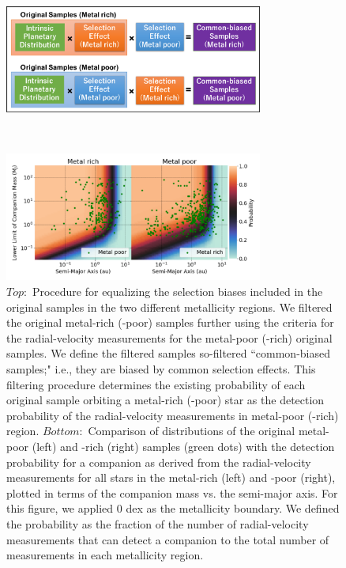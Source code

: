 \documentclass[twocolumn]{aastex62}
\begin{document}
\begin{CJK*}{UTF8}{min}
\begin{figure}
\begin{minipage}[t]{1\hsize}
\begin{center}
\includegraphics[width=8.5cm]{procedure.pdf}
\end{center}
\end{minipage} \\
\begin{minipage}[t]{1\hsize}
\begin{center}
\includegraphics[width=8.5cm]{bias_one.pdf}
\caption{$Top:$ Procedure for equalizing the selection biases included in the original samples in the two different metallicity regions. We filtered the original metal-rich (-poor) samples further using the criteria for the radial-velocity measurements for the metal-poor (-rich) original samples. We define the filtered samples so-filtered ``common-biased samples;" i.e., they are biased by common selection effects. This filtering procedure determines the existing probability of each original sample orbiting a metal-rich (-poor) star as the detection probability of the radial-velocity measurements in metal-poor (-rich) region. $Bottom:$ Comparison of distributions of the original metal-poor (left) and -rich (right) samples (green dots) with the detection probability for a companion as derived from the radial-velocity measurements for all stars in the metal-rich (left) and -poor (right), plotted in terms of the companion mass vs. the semi-major axis. For this figure, we applied 0 dex as the metallicity boundary. We defined the probability as the fraction of the number of radial-velocity measurements that can detect a companion to the total number of measurements in each metallicity region.}
\label{fig:procedure}
\end{center}
\end{minipage}
\end{figure}


\end{CJK*}
\end{document}
